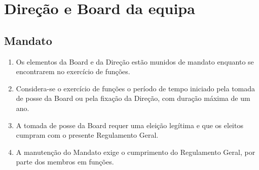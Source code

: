 \chapter{Direção e Board da equipa}

\section{Mandato}
\begin{enumerate}
  \item Os elementos da Board e da Direção estão munidos de mandato enquanto se encontrarem no exercício de funções.
  \item Considera-se o exercício de funções o período de tempo iniciado pela tomada de posse da Board ou pela fixação da Direção, com duração máxima de um ano.
  \item A tomada de posse da Board requer uma eleição legítima e que os eleitos cumpram com o presente Regulamento Geral.
  \item A manutenção do Mandato exige o cumprimento do Regulamento Geral, por parte dos membros em funções.
\end{enumerate}

